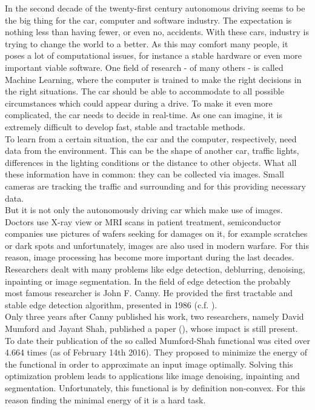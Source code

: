 \documentclass{scrreprt}
\begin{document}
    In the second decade of the twenty-first century autonomous driving seems to be the big thing for the car, computer and software industry. The expectation is nothing less than having fewer, or even no, accidents. With these cars, industry is trying to change the world to a better. As this may comfort many people, it poses a lot of computational issues, for instance a stable hardware or even more important viable software. One field of research - of many others - is called Machine Learning, where the computer is trained to make the right decisions in the right situations. The car should be able to accommodate to all possible circumstances which could appear during a drive. To make it even more complicated, the car needs to decide in real-time. As one can imagine, it is extremely difficult to develop fast, stable and tractable methods.\\
    To learn from a certain situation, the car and the computer, respectively, need data from the environment. This can be the shape of another car, traffic lights, differences in the lighting conditions or the distance to other objects. What all these information have in common: they can be collected via images. Small cameras are tracking the traffic and surrounding and for this providing necessary data.\\
    But it is not only the autonomously driving car which make use of images. Doctors use X-ray view or MRI scans in patient treatment, semiconductor companies use pictures of wafers seeking for damages on it, for example scratches or dark spots and unfortunately, images are also used in modern warfare. For this reason, image processing has become more important during the last decades. Researchers dealt with many problems like edge detection, deblurring, denoising, inpainting or image segmentation. In the field of edge detection the probably most famous researcher is John F. Canny. He provided the first tractable and stable edge detection algorithm, presented in 1986 (c.f. \cite{Canny}).\\
    Only three years after Canny published his work, two researchers, namely David Mumford and Jayant Shah, published a paper (\cite{Mumford-et-al-cpam}), whose impact is still present. To date their publication of the so called Mumford-Shah functional was cited over 4.664 times (as of February 14th 2016). They proposed to minimize the energy of the functional in order to approximate an input image optimally. Solving this optimization problem leads to applications like image denoising, inpainting and segmentation. Unfortunately, this functional is by definition non-convex. For this reason finding the minimal energy of it is a hard task.\\
\end{document}
